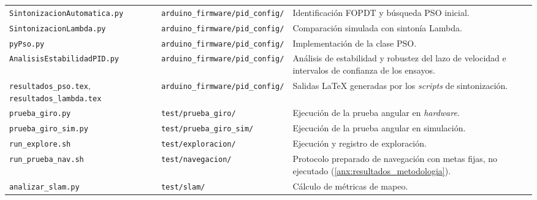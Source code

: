 \begin{appendices}
\begin{longtable}{p{4.5cm} p{4.0cm} p{5.0cm}}
\texttt{SintonizacionAutomatica.\allowbreak{}py} & \texttt{arduino\_\allowbreak{}firmware/\allowbreak{}pid\_\allowbreak{}config/} & Identificación FOPDT y búsqueda PSO inicial. \\
\texttt{SintonizacionLambda.\allowbreak{}py} & \texttt{arduino\_\allowbreak{}firmware/\allowbreak{}pid\_\allowbreak{}config/} & Comparación simulada con sintonía Lambda. \\
\texttt{pyPso.\allowbreak{}py} & \texttt{arduino\_\allowbreak{}firmware/\allowbreak{}pid\_\allowbreak{}config/} & Implementación de la clase PSO. \\
\texttt{AnalisisEstabilidad\allowbreak{}PID.\allowbreak{}py} & \texttt{arduino\_\allowbreak{}firmware/\allowbreak{}pid\_\allowbreak{}config/} & Análisis de estabilidad y robustez del lazo de velocidad e intervalos de confianza de los ensayos. \\
\texttt{resultados\_\allowbreak{}pso.\allowbreak{}tex}, \texttt{resultados\_\allowbreak{}lambda.\allowbreak{}tex} & \texttt{arduino\_\allowbreak{}firmware/\allowbreak{}pid\_\allowbreak{}config/} & Salidas LaTeX generadas por los \textit{scripts} de sintonización. \\
\texttt{prueba\_\allowbreak{}giro.\allowbreak{}py} & \texttt{test/\allowbreak{}prueba\_\allowbreak{}giro/} & Ejecución de la prueba angular en \textit{hardware}. \\
\texttt{prueba\_\allowbreak{}giro\_\allowbreak{}sim.\allowbreak{}py} & \texttt{test/\allowbreak{}prueba\_\allowbreak{}giro\_\allowbreak{}sim/} & Ejecución de la prueba angular en simulación. \\
\texttt{run\_\allowbreak{}explore.\allowbreak{}sh} & \texttt{test/\allowbreak{}exploracion/} & Ejecución y registro de exploración. \\
\texttt{run\_\allowbreak{}prueba\_\allowbreak{}nav.\allowbreak{}sh} & \texttt{test/\allowbreak{}navegacion/} & Protocolo preparado de navegación con metas fijas, no ejecutado (\ref{anx:resultados_metodologia}). \\
\texttt{analizar\_\allowbreak{}slam.\allowbreak{}py} & \texttt{test/\allowbreak{}slam/} & Cálculo de métricas de mapeo. \\
\end{longtable}
\endgroup


\end{appendices}
